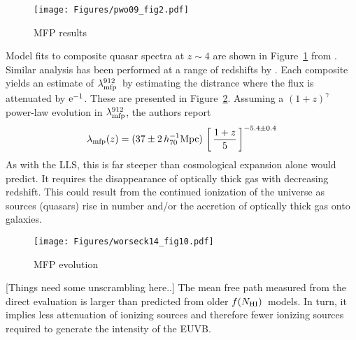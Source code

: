 \documentclass[graybox]{svmult}
\def\ltk{\left [ \,}
\def\rtk{\, \right  ] }
\newcommand{\mnhi}{N_{\rm HI}}
\def\mfnhi{f(\mnhi)}
\def\fnhi{$\mfnhi$}
\def\mlmfp{\lambda_{\rm mfp}^{912}}
\def\lmfp{$\mlmfp$}
\begin{document}
%
\begin{figure}[b]
\sidecaption
\texttt{[image: Figures/pwo09\_fig2.pdf]}
%
%
\caption{MFP results
}
\label{fig:pwo_fig2}       %
\end{figure}

Model fits to composite quasar spectra at $z \sim 4$ are 
shown in Figure~\ref{fig:pwo_fig2} from \cite{pow09}.
Similar analysis has been performed at a range of redshifts
by \cite{omeara13,f13,worseck14}.
Each composite yields an estimate of \lmfp\ by estimating the
distrance where the flux is attenuated by $\rm e^{-1}$.
These are presented in Figure~\ref{fig:w14_fig10}.
Assuming a $(1+z)^\gamma$ power-law evolution in \lmfp,
the authors report 
\begin{equation}
\lambda_{\rm mfp}(z) = (37 \pm 2 \, h_{70}^{-1} {\rm Mpc})
\, \ltk \frac{1+z}{5} \rtk^{-5.4 \pm 0.4}
\end{equation}
As with the LLS, this is far steeper than cosmological
expansion alone would predict.  It requires the disappearance
of optically thick gas with decreasing redshift.  This
could result from the
continued ionization of the universe as sources (quasars)
rise in number and/or
the accretion of optically thick gas onto galaxies.

%
\begin{figure}[b]
\sidecaption
\texttt{[image: Figures/worseck14\_fig10.pdf]}
%
%
\caption{MFP evolution
}
\label{fig:w14_fig10}       %
\end{figure}


[Things need some unscrambling here..]
The mean free path measured from the direct evaluation
is larger than predicted from older \fnhi\ models.
In turn, it implies
less attenuation of ionizing sources
and therefore fewer ionizing sources required to generate the 
intensity of the EUVB.
\end{document}
